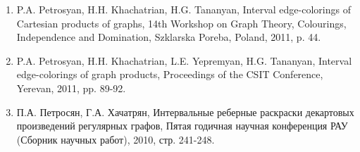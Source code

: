 \begin{enumerate}
    \item P.A. Petrosyan, H.H. Khachatrian, H.G. Tananyan, Interval edge-colorings of Cartesian products of graphs, 14th Workshop on Graph Theory, Colourings, Independence and Domination, Szklarska Poreba, Poland, 2011, p. 44.
    \item P.A. Petrosyan, H.H. Khachatrian, L.E. Yepremyan, H.G. Tananyan, Interval edge-colorings of graph products, Proceedings of the CSIT Conference, Yerevan, 2011, pp. 89-92.
    \item П.А. Петросян, Г.А. Хачатрян, Интервальные реберные раскраски декартовых произведений регулярных графов, Пятая годичная научная конференция РАУ (Сборник научных работ), 2010, стр. 241-248.
\end{enumerate}